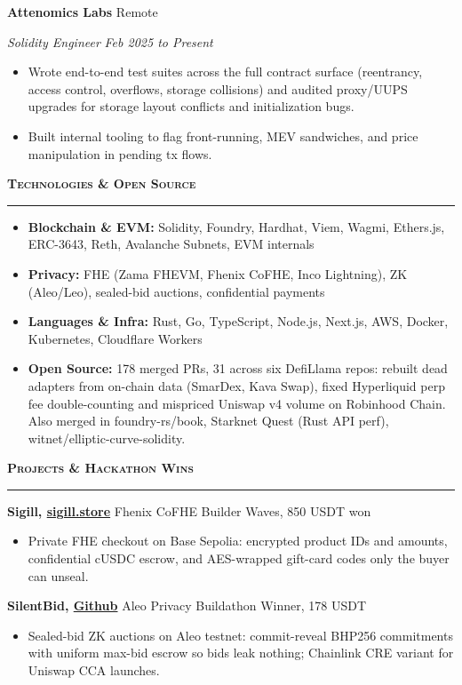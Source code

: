 \documentclass[letterpaper,10pt]{article}
\newcommand{\sectionrule}[1]{%
  \vspace{3pt}%
  {\large\scshape\bfseries #1}\par\vspace{1pt}\hrule\vspace{3pt}%
}
\newcommand{\entry}[2]{%
  \textbf{#1} \hfill {\small #2}\par%
}
\newcommand{\subentry}[2]{%
  {\itshape #1} \hfill {\small\itshape #2}\par\vspace{1pt}%
}
\newenvironment{bullets}{%
  \begin{itemize}\setlength{\itemsep}{0pt}\setlength{\parskip}{0pt}
\setlength{\leftmargini}{1.15em}\setlength{\topsep}{1pt}%
}{\end{itemize}\vspace{1pt}}
\begin{document}
\entry{Attenomics Labs}{Remote}
\subentry{Solidity Engineer}{Feb 2025 to Present}
\begin{bullets}
  \item Wrote end-to-end test suites across the full contract surface (reentrancy, access control, overflows, storage
        collisions) and audited proxy/UUPS upgrades for storage layout conflicts and initialization bugs.
  \item Built internal tooling to flag front-running, MEV sandwiches, and price manipulation in pending tx flows.
\end{bullets}

\sectionrule{Technologies \& Open Source}
\begin{bullets}
  \item \textbf{Blockchain \& EVM:} Solidity, Foundry, Hardhat, Viem, Wagmi, Ethers.js, ERC-3643, Reth, Avalanche Subnets, EVM internals
  \item \textbf{Privacy:} FHE (Zama FHEVM, Fhenix CoFHE, Inco Lightning), ZK (Aleo/Leo), sealed-bid auctions, confidential payments
  \item \textbf{Languages \& Infra:} Rust, Go, TypeScript, Node.js, Next.js, AWS, Docker, Kubernetes, Cloudflare Workers
  \item \textbf{Open Source:} 178 merged PRs, 31 across six DefiLlama repos: rebuilt dead adapters from on-chain
        data (SmarDex, Kava Swap), fixed Hyperliquid perp fee double-counting and mispriced Uniswap v4 volume on
        Robinhood Chain. Also merged in foundry-rs/book, Starknet Quest (Rust API perf), witnet/elliptic-curve-solidity.
\end{bullets}

\sectionrule{Projects \& Hackathon Wins}

\entry{Sigill, \href{https://www.sigill.store/}{sigill.store}}{Fhenix CoFHE Builder Waves, 850 USDT won}
\begin{bullets}
  \item Private FHE checkout on Base Sepolia: encrypted product IDs and amounts, confidential cUSDC escrow, and
        AES-wrapped gift-card codes only the buyer can unseal.
\end{bullets}

\entry{SilentBid, \href{https://github.com/0xshubhs/aleo-}{Github}}{Aleo Privacy Buildathon Winner, 178 USDT}
\begin{bullets}
  \item Sealed-bid ZK auctions on Aleo testnet: commit-reveal BHP256 commitments with uniform max-bid escrow so bids
        leak nothing; Chainlink CRE variant for Uniswap CCA launches.
\end{bullets}
\end{document}

